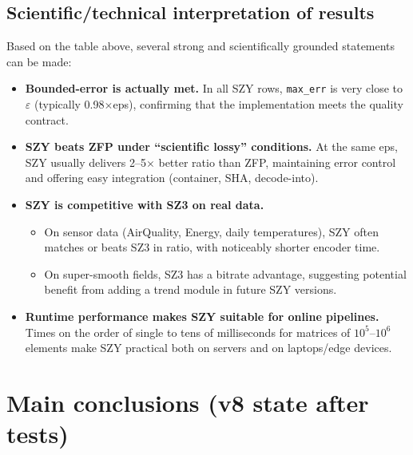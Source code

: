 \documentclass[11pt,a4paper]{article}
\begin{document}
\subsection{Scientific/technical interpretation of results}
Based on the table above, several strong and scientifically grounded statements can be made:

\begin{itemize}
  \item \textbf{Bounded-error is actually met.}
        In all SZY rows, \texttt{max\_err} is very close to $\varepsilon$ (typically 0.98$\times$eps), confirming that the implementation meets the quality contract.
  \item \textbf{SZY beats ZFP under ``scientific lossy'' conditions.}
        At the same eps, SZY usually delivers 2--5$\times$ better ratio than ZFP, maintaining error control and offering easy integration (container, SHA, decode-into).
  \item \textbf{SZY is competitive with SZ3 on real data.}
        \begin{itemize}
          \item On sensor data (AirQuality, Energy, daily temperatures), SZY often matches or beats SZ3 in ratio, with noticeably shorter encoder time.
          \item On super-smooth fields, SZ3 has a bitrate advantage, suggesting potential benefit from adding a trend module in future SZY versions.
        \end{itemize}
  \item \textbf{Runtime performance makes SZY suitable for online pipelines.}
        Times on the order of single to tens of milliseconds for matrices of $10^5$--$10^6$ elements make SZY practical both on servers and on laptops/edge devices.
\end{itemize}

\section{Main conclusions (v8 state after tests)}
\end{document}
